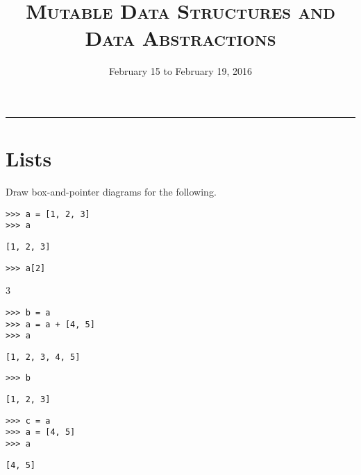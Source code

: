 \documentclass{exam}
\title{\textsc{Mutable Data Structures and Data Abstractions}}
\date{February 15 to February 19, 2016}
\begin{document}
\maketitle
\rule{\textwidth}{0.15em}
\fontsize{12}{15}\selectfont


\section{Lists}

\begin{questions}


\begin{blocksection}
\question Draw box-and-pointer diagrams for the following.

\begin{lstlisting}
>>> a = [1, 2, 3]
>>> a
\end{lstlisting}
\begin{solution}[.25in]
\begin{lstlisting}
[1, 2, 3]
\end{lstlisting}
\end{solution}

\begin{lstlisting}
>>> a[2]
\end{lstlisting}
\begin{solution}[.25in]
3
\end{solution}

\begin{lstlisting}
>>> b = a
>>> a = a + [4, 5]
>>> a
\end{lstlisting}
\begin{solution}[.25in]
\begin{lstlisting}
[1, 2, 3, 4, 5]
\end{lstlisting}
\end{solution}

\begin{lstlisting}
>>> b
\end{lstlisting}
\begin{solution}[.25in]
\begin{lstlisting}
[1, 2, 3]
\end{lstlisting}
\end{solution}

\begin{lstlisting}
>>> c = a
>>> a = [4, 5]
>>> a
\end{lstlisting}
\begin{solution}[.25in]
\begin{lstlisting}
[4, 5]
\end{lstlisting}
\end{solution}


\end{blocksection}
\end{questions}
\end{document}
